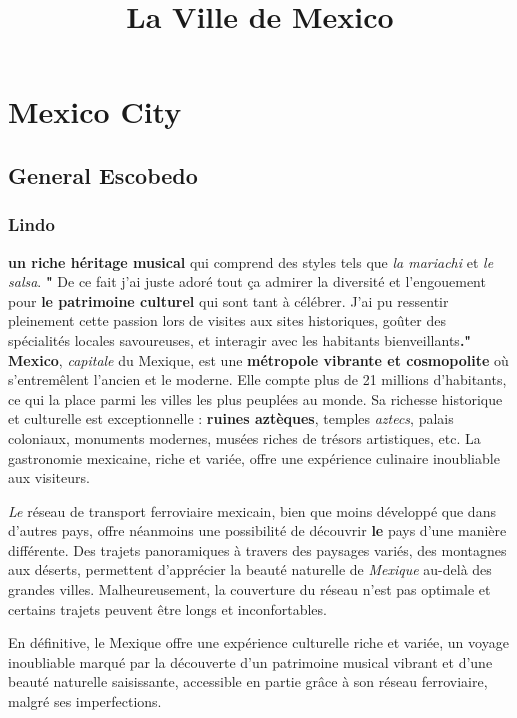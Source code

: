 \documentclass[12pt, a4paper]{article}
\title{La Ville de Mexico}
\author{}
\date{}
\begin{document}
\maketitle

\section*{Mexico City}

\subsection{General Escobedo}

\subsubsection{Lindo}


\textbf{un riche héritage musical} qui comprend des styles tels que \textit{la mariachi} et \textit{le salsa}. \textbf{"}
De ce fait j'ai juste adoré tout ça admirer la diversité et l’engouement pour \textbf{le patrimoine culturel} qui sont tant à célébrer. J’ai pu ressentir pleinement cette passion lors de visites aux sites historiques, goûter des spécialités locales savoureuses, et interagir avec les habitants bienveillants\textbf{."}
\textbf{Mexico}, \textit{capitale} du Mexique, est une \textbf{métropole vibrante et cosmopolite} où s'entremêlent l'ancien et le moderne. Elle compte plus de 21 millions d'habitants, ce qui la place parmi les villes les plus peuplées au monde. Sa richesse historique et culturelle est exceptionnelle : \textbf{ruines aztèques}, temples \textit{aztecs}, palais coloniaux, monuments modernes, musées riches de trésors artistiques, etc. La gastronomie mexicaine, riche et variée, offre une expérience culinaire inoubliable aux visiteurs.


{}

\textit{Le} réseau de transport ferroviaire mexicain, bien que moins développé que dans d’autres pays, offre néanmoins une possibilité de découvrir \textbf{le} pays d’une manière différente.  Des trajets panoramiques à travers des paysages variés, des montagnes aux déserts, permettent d’apprécier la beauté naturelle de \textit{Mexique} au-delà des grandes villes.  Malheureusement, la couverture du réseau n’est pas optimale et certains trajets peuvent être longs et inconfortables.

En définitive, le Mexique offre une expérience culturelle riche et variée, un voyage inoubliable marqué par la découverte d'un patrimoine musical vibrant et d'une beauté naturelle saisissante, accessible en partie grâce à son réseau ferroviaire, malgré ses imperfections.
\end{document}
